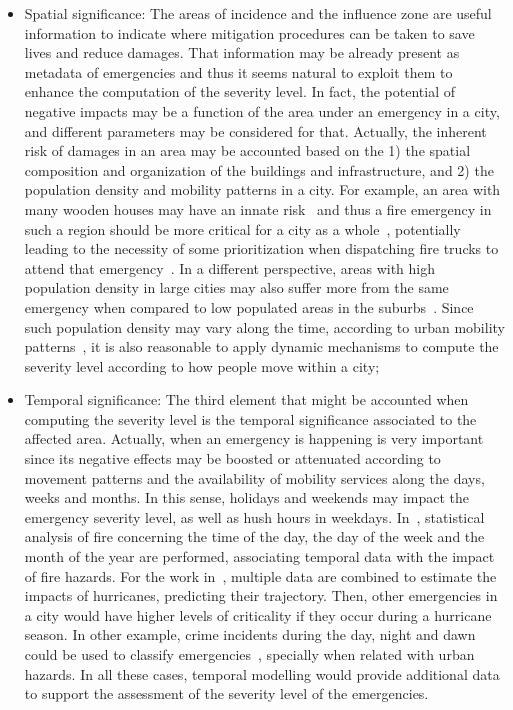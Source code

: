 \begin{refsection}
\begin{itemize}
  \item Spatial significance: The areas of incidence and the influence zone are useful information to indicate where mitigation procedures can be taken to save lives and reduce damages. That information may be already present as metadata of emergencies and thus it seems natural to exploit them to enhance the computation of the severity level. In fact, the potential of negative impacts may be a function of the area under an emergency in a city, and different parameters may be considered for that. Actually, the inherent risk of damages in an area may be accounted based on the 1) the spatial composition and organization of the buildings and infrastructure, and 2) the population density and mobility patterns in a city. For example, an area with many wooden houses may have an innate risk~\cite{firespatial1} and thus a fire emergency in such a region should be more critical for a city as a whole~\cite{firespatial2}, potentially leading to the necessity of some prioritization when dispatching fire trucks to attend that emergency~\cite{costa2020automatic}. In a different perspective, areas with high population density in large cities may also suffer more from the same emergency when compared to low populated areas in the suburbs~\cite{firespatial3}. Since such population density may vary along the time, according to urban mobility patterns~\cite{mobilityEmergencies1}, it is also reasonable to apply dynamic mechanisms to compute the severity level according to how people move within a city;

  \item Temporal significance: The third element that might be accounted when computing the severity level is the temporal significance associated to the affected area. Actually, when an emergency is happening is very important since its negative effects may be boosted or attenuated according to movement patterns and the availability of mobility services along the days, weeks and months. In this sense, holidays and weekends may impact the emergency severity level, as well as hush hours in weekdays. In~\cite{firetemporaldata1}, statistical analysis of fire concerning the time of the day, the day of the week and the month of the year are performed, associating temporal data with the impact of fire hazards. For the work in~\cite{hurricanetemporal1}, multiple data are combined to estimate the impacts of hurricanes, predicting their trajectory. Then, other emergencies in a city would have higher levels of criticality if they occur during a hurricane season. In other example, crime incidents during the day, night and dawn could be used to classify emergencies~\cite{crimetemporal1}, specially when related with urban hazards. In all these cases, temporal modelling would provide additional data to support the assessment of the severity level of the emergencies.
\end{itemize}


\end{refsection}
